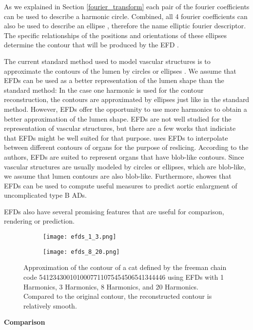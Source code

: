 \documentclass[thesis.tex]{subfiles}
\begin{document}
As we explained in Section \ref{fourier_transform} each pair of the fourier coefficients can be used to describe a harmonic circle. Combined, all 4 fourier coefficients can also be used to describe an ellipse \cite{lin1987new,giardinia}, therefore the name elliptic fourier descriptor. The specific relationships of the positions and orientations of these ellipses determine the contour that will be produced by the EFD \cite{lin1987new}.

The current standard method used to model vascular structures is to approximate the contours of the lumen by circles or ellipses \cite{wu2011segmentation}. We assume that EFDs can be used as a better representation of the lumen shape than the standard method: In the case one harmonic is used for the contour reconstruction, the contours are approximated by ellipses just like in the standard method. However, EFDs offer the opportunity to use more harmonics to obtain a better approximation of the lumen shape. EFDs are not well studied for the representation of vascular structures, but there are a few works that indiciate that EFDs might be well suited for that purpose. \cite{jeong2007reslicing} uses EFDs to interpolate between different contours of organs for the purpose of reslicing. According to the authors, EFDs are suited to represent organs that have blob-like contours. Since vascular structures are usually modeled by circles or ellipses, which are blob-like, we assume that lumen contours are also blob-like. Furthermore, \cite{sato2017new} showes that EFDs can be used to compute useful measures to predict aortic enlargment of uncomplicated type B ADs.
     
EFDs also have several promising features that are useful for comparison, rendering or prediction.

\begin{figure}
	\begin{subfigure}{\textwidth}
		\texttt{[image: efds\_1\_3.png]}		
	\end{subfigure}
	\begin{subfigure}{\textwidth}
		\texttt{[image: efds\_8\_20.png]}		
	\end{subfigure}
	\caption{Approximation of the contour of a cat defined by the freeman chain code 5412343001010007711075454506541344446 using EFDs with 1 Harmonics, 3 Harmonics, 8 Harmonics, and 20 Harmonics. Compared to the original contour, the reconstructed contour is relatively smooth.}
\label{fig:efd_approx}
\end{figure}
\newpage
\textbf{Comparison}
\end{document}
